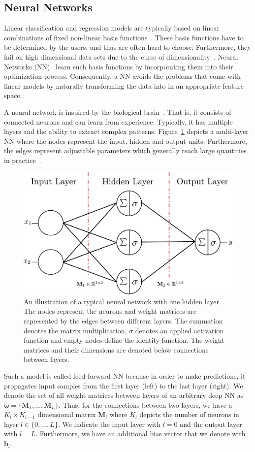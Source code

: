 \documentclass[runningheads]{llncs}
\begin{document}
\subsection{Neural Networks}
\label{sec:neural_networks}
Linear classification and regression models are typically based on linear combinations of fixed non-linear basis functions~\cite{bishop:2006:PRML}.
These basis functions have to be determined by the users, and thus are often hard to choose. 
Furthermore, they fail on high dimensional data sets due to the curse of dimensionality~\cite{bishop:2006:PRML}.
Neural Networks (NN)~\cite{HaykinNeuralNetworks} learn such basis functions by incorporating them into their optimization process. 
Consequently, a NN avoids the problems that come with linear models by naturally transforming the data into in an appropriate feature space.

A neural network is inspired by the biological brain~\cite{amit1992modeling}. 
That is, it consists of connected neurons and can learn from experience. 
Typically, it has multiple layers and the ability to extract complex patterns.
Figure~\ref{fig:normal_NN} depicts a multi-layer NN where the nodes represent the input, hidden and output units.
Furthermore, the edges represent adjustable parameters which generally reach large quantities in practice~\cite{efficient_net}.
\begin{figure}
    \centering
    \includegraphics[width=.6\textwidth]{images/NeuralNetwork.pdf}
    \caption{An illustration of a typical neural network with one hidden layer. The nodes represent the neurons and weight matrices are represented by the edges between different layers.
    The summation denotes the matrix multiplication, $\sigma$ denotes an applied activation function and empty nodes define the identity function.
    The weight matrices and their dimensions are denoted below connections between layers.
    }
    \label{fig:normal_NN}
\end{figure}
Such a model is called feed-forward NN because in order to make predictions, it propagates input samples from the first layer (left) to the last layer (right).
We denote the set of all weight matrices between layers of an arbitrary deep NN as $\boldsymbol{\omega} = \{\mathbf{M}_1, \ldots, \mathbf{M}_L\}$.
Thus, for the connections between two layers, we have a $K_l \times K_{l-1}$ dimensional matrix $\mathbf{M}_l$ where $K_l$ depicts the number of neurons in layer $l\in \{0, \ldots, L\}$.
We indicate the input layer with $l=0$ and the output layer with $l = L$.
Furthermore, we have an additional bias vector that we denote with $\mathbf{b}_l$. 
\end{document}

